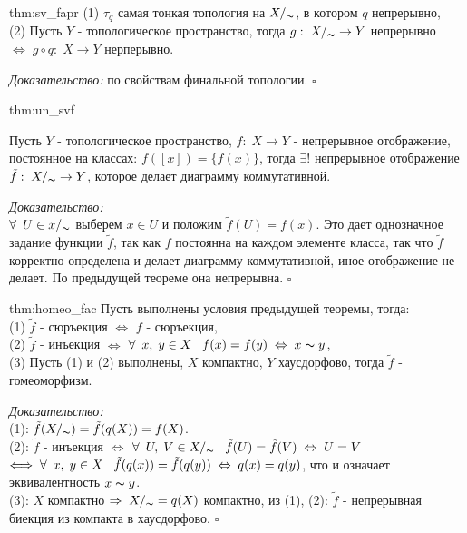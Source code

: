 \documentclass[../../main.tex]{subfiles}
\begin{document}
\begin{theo}[]{thm:sv_fapr}
(1) $\tau_q$ самая тонкая топология на $X/_{\thicksim}$, в котором $q$ непрерывно,\\
(2) Пусть $Y$ - топологическое пространство, тогда $g:\; X/_\thicksim\rightarrow Y$ непрерывно $\Leftrightarrow\; g\circ q:\; X\rightarrow Y$ нерперывно.
\end{theo}
\textit{Доказательство:} по свойствам финальной топологии.  $\square$

\begin{theo}{thm:un_svf}
\begin{minipage}{0.80\linewidth}
Пусть $Y$ - топологическое пространство, $f:\;X\rightarrow Y$ - непрерывное отображение, постоянное на классах: $f([x]) = \{f(x)\}$, тогда $\exists!$ непрерывное отображение $\tilde f:\; X/_\thicksim \rightarrow Y$, которое делает диаграмму коммутативной.
\end{minipage}
\begin{minipage}{0.20\linewidth}
\end{minipage}
\end{theo}
\textit{Доказательство:}\\
$\forall\:\; U\in x/_\thicksim$ выберем $x\in U$ и положим $\tilde f(U) = f(x)$. Это дает однозначное задание функции $\tilde f$, так как $f$ постоянна на каждом элементе класса, так что $\tilde f$ корректно определена и делает диаграмму коммутативной, иное отображение не делает. По предыдущей теореме она непрерывна. $\square$

\begin{theo}[]{thm:homeo_fac}
Пусть выполнены условия предыдущей теоремы, тогда:\\
(1) $\tilde f$ - сюръекция $\Longleftrightarrow$ $f$ - сюръекция,\\
(2) $\tilde f$ - инъекция $\Longleftrightarrow$ $\forall\:\;x,\;y\in X\;\;\; f(x) = f(y) \;\Leftrightarrow\;x\thicksim y$,\\
(3) Пусть (1) и (2) выполнены, $X$ компактно, $Y$ хаусдорфово, тогда $\tilde f$ - гомеоморфизм.
\end{theo}
\textit{Доказательство:}\\
(1): $\tilde f (X/_\thicksim) = \tilde f(q(X)) = f(X)$.\\
(2): $\tilde f$ - инъекция $\Longleftrightarrow$ $\forall\:\; U,\;V\in X/_\thicksim\;\;\; \tilde f (U) = \tilde f(V)\; \Leftrightarrow\; U=V$ $\Longleftrightarrow\; \forall\:\; x,\; y\in X\;\;\; \tilde f(q(x)) = \tilde f(q(y))\;\Leftrightarrow\; q(x)=q(y)$, что и означает эквивалентность $x\thicksim y$.\\
(3): $X$ компактно $\Rightarrow\; X/_\thicksim = q(X)$ компактно, из (1), (2): $\tilde f$ - непрерывная биекция из компакта в хаусдорфово. $\square$
\end{document}
